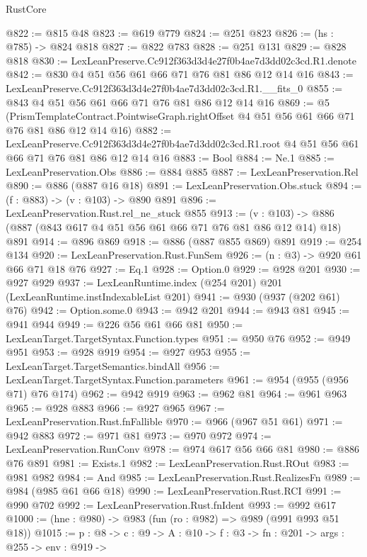 \begin{lexlean}{RustCore}
\begin{coremodule}
@822 := @815 @48
@823 := @619 @779
@824 := @251 @823
@826 := (hs : @785) -> @824 @818
@827 := @822 @783
@828 := @251 @131
@829 := @828 @818
@830 := LexLeanPreserve.Cc912f363d3d4e27f0b4ae7d3dd02c3cd.R1.denote
@842 := @830 @4 @51 @56 @61 @66 @71 @76 @81 @86 @12 @14 @16
@843 := LexLeanPreserve.Cc912f363d3d4e27f0b4ae7d3dd02c3cd.R1.__fits_0
@855 := @843 @4 @51 @56 @61 @66 @71 @76 @81 @86 @12 @14 @16
@869 := @5
    (PrismTemplateContract.PointwiseGraph.rightOffset
      @4
      @51
      @56
      @61
      @66
      @71
      @76
      @81
      @86
      @12
      @14
      @16)
@882 := LexLeanPreserve.Cc912f363d3d4e27f0b4ae7d3dd02c3cd.R1.root
    @4
    @51
    @56
    @61
    @66
    @71
    @76
    @81
    @86
    @12
    @14
    @16
@883 := Bool
@884 := Ne.{1}
@885 := LexLeanPreservation.Obs
@886 := @884 @885
@887 := LexLeanPreservation.Rel
@890 := @886 (@887 @16 @18)
@891 := LexLeanPreservation.Obs.stuck
@894 := (f : @883) -> (v : @103) -> @890 @891
@896 := LexLeanPreservation.Rust.rel_ne_stuck @855
@913 := (v : @103) -> @886 (@887 (@843 @617 @4 @51 @56 @61 @66 @71 @76 @81 @86 @12 @14) @18) @891
@914 := @896 @869
@918 := @886 (@887 @855 @869) @891
@919 := @254 @134
@920 := LexLeanPreservation.Rust.FunSem
@926 := (n : @3) -> @920 @61 @66 @71 @18 @76
@927 := Eq.{1}
@928 := Option.{0}
@929 := @928 @201
@930 := @927 @929
@937 := LexLeanRuntime.index (@254 @201) @201 (LexLeanRuntime.instIndexableList @201)
@941 := @930 (@937 (@202 @61) @76)
@942 := Option.some.{0}
@943 := @942 @201
@944 := @943 @81
@945 := @941 @944
@949 := @226 @56 @61 @66 @81
@950 := LexLeanTarget.TargetSyntax.Function.types
@951 := @950 @76
@952 := @949 @951
@953 := @928 @919
@954 := @927 @953
@955 := LexLeanTarget.TargetSemantics.bindAll
@956 := LexLeanTarget.TargetSyntax.Function.parameters
@961 := @954 (@955 (@956 @71) @76 @174)
@962 := @942 @919
@963 := @962 @81
@964 := @961 @963
@965 := @928 @883
@966 := @927 @965
@967 := LexLeanPreservation.Rust.fnFallible
@970 := @966 (@967 @51 @61)
@971 := @942 @883
@972 := @971 @81
@973 := @970 @972
@974 := LexLeanPreservation.RunConv
@978 := @974 @617 @56 @66 @81
@980 := @886 @76 @891
@981 := Exists.{1}
@982 := LexLeanPreservation.Rust.ROut
@983 := @981 @982
@984 := And
@985 := LexLeanPreservation.Rust.RealizesFn
@989 := @984 (@985 @61 @66 @18)
@990 := LexLeanPreservation.Rust.RCI
@991 := @990 @702
@992 := LexLeanPreservation.Rust.fnIdent
@993 := @992 @617
@1000 := (hne : @980) -> @983 (fun (ro : @982) => @989 (@991 @993 @51 @18))
@1015 := {p : @8} ->
  {c : @9} ->
  {A : @10} ->
  {f : @3} ->
  {fn : @201} ->
  {args : @255} ->
  {env : @919} ->

\end{coremodule}
\end{lexlean}
